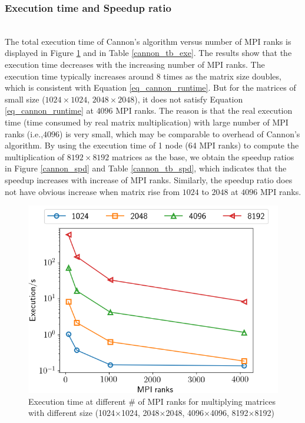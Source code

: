 \documentclass[conference]{IEEEtran}
\begin{document}
\subsubsection{Execution time and Speedup ratio}\\
The total execution time of Cannon's algorithm versus number of MPI ranks is displayed in Figure \ref{cannon_exe} and in Table \ref{cannon_tb_exe}. The results show that the execution time decreases with the increasing number of MPI ranks. The execution time typically increases around 8 times as the matrix size doubles, which is consistent with Equation \ref{eq_cannon_runtime}. But for the matrices of small size ($1024\times1024$, $2048 \times 2048$), it does not satisfy Equation \ref{eq_cannon_runtime} at $4096$ MPI ranks. The reason is that the real execution time (time consumed by real matrix multiplication) with large number of MPI ranks (i.e.,$4096$) is very small, which may be comparable to overhead of Cannon's algorithm. By using the execution time of 1 node (64 MPI ranks) to compute the multiplication of $8192\times8192$ matrices as the base, we obtain the speedup ratios in Figure \ref{cannon_spd} and Table \ref{cannon_tb_spd}, which indicates that the speedup increases with increase of MPI ranks. Similarly, the speedup ratio does not have obvious increase when matrix rise from $1024$ to $2048$ at $4096$ MPI ranks. 
\begin{figure}[!h]
    \centering
    \includegraphics[scale=0.4]{Figures/cannon/execution_vs_ranks.png}
    \caption{ Execution time at different \# of MPI ranks for multiplying matrices with different size (1024$\times$1024, 2048$\times$2048, 4096$\times$4096, 8192$\times$8192)}
    \label{cannon_exe}
\end{figure}
\end{document}
